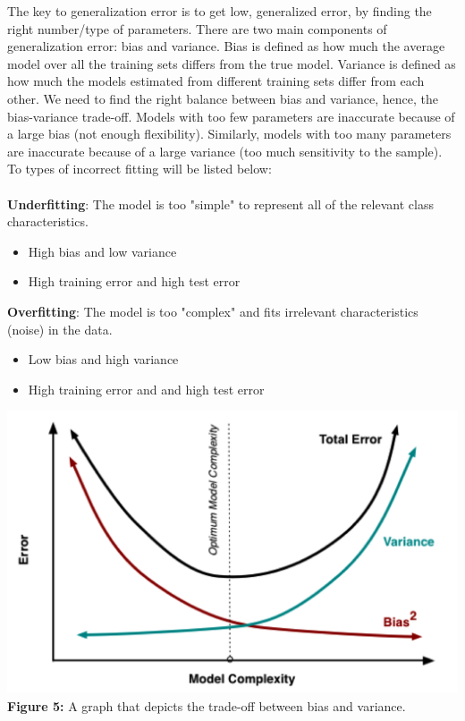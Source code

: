 \documentclass{article}
\begin{document}
The key to generalization error is to get low, generalized error, by finding the right number/type of parameters. There are two main components of generalization error: bias and variance. Bias is defined as how much the average model over all the training sets differs from the true model. Variance is defined as how much the models estimated from different training sets differ from each other. We need to find the right balance between bias and variance, hence, the bias-variance trade-off. Models with too few parameters are inaccurate because of a large bias (not enough flexibility). Similarly, models with too many parameters are inaccurate because of a large variance (too much sensitivity to the sample). To types of incorrect fitting will be listed below:
\\~\\
\textbf{Underfitting}: The model is too "simple" to represent all of the relevant class characteristics.
\begin{itemize}
    \item High bias and low variance
    \item High training error and high test error
\end{itemize}
\textbf{Overfitting}: The model is too "complex" and fits irrelevant characteristics (noise) in the data.
\begin{itemize}
    \item Low bias and high variance
    \item High training error and and high test error
\end{itemize}

\begin{center}
	\includegraphics[scale=0.35]{Bias-VarianceTrade-Off.png}\\
    \textbf{Figure 5:} A graph that depicts the trade-off between bias and variance.\\
\end{center}
\end{document}
